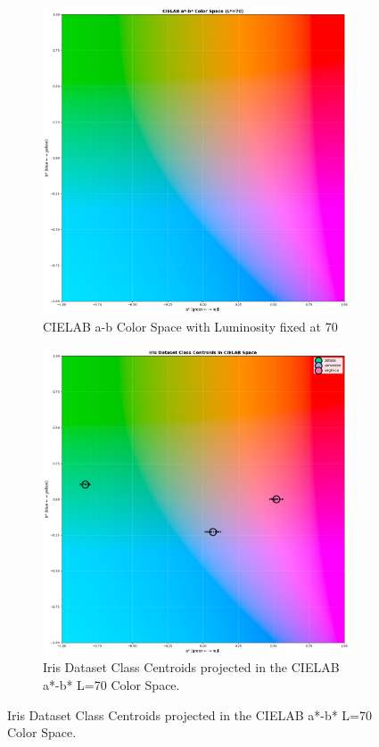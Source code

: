 \begin{figure}
    \centering
    \begin{subfigure}[c]{0.45\textwidth}
        \includegraphics[width=\textwidth]{images/CIELAB a-b Color Space (L=70).png}
        \caption{CIELAB a-b Color Space with Luminosity fixed at 70}
    \end{subfigure}
    \hfill
    \begin{subfigure}[c]{0.45\textwidth}
        \includegraphics[width=\textwidth]{images/Iris Dataset Class Centroids in CIELAB Space.png}
        \caption{Iris Dataset Class Centroids projected in the CIELAB a*-b* L=70 Color Space.}
    \end{subfigure}


\end{figure}
